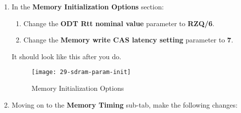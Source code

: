 \begin{flushleft}
\begin{enumerate}[
	label=\textbf{Step \arabic*.},
	leftmargin=*,
	widest={00},
	align=left]
\begin{enumerate}[
	label=\textbf{Step \arabic{enumi}\alph*.},
	leftmargin=*,
	align=left]
\item Change the \textbf{Total interface width} parameter to \textbf{32}.

\item Change the \textbf{Row address width} parameter to \textbf{15}.

\item Change the \textbf{Column address width} parameter to \textbf{10}.

\end{enumerate}

It should look like this after you do.

\begin{figure}[H]
\centering
\texttt{[image: 28-sdram-param]}
\caption{Memory Parameters}
\label{fig:28-sdram-param}
\end{figure}

\item In the \textbf{Memory Initialization Options} section:

\begin{enumerate}[
	label=\textbf{Step \arabic{enumi}\alph*.},
	leftmargin=*,
	align=left]

\item Change the \textbf{ODT Rtt nominal value} parameter to \textbf{RZQ/6}.

\item Change the \textbf{Memory write CAS latency setting} parameter to \textbf{7}.

\end{enumerate}

It should look like this after you do.

\begin{figure}[H]
\centering
\texttt{[image: 29-sdram-param-init]}
\caption{Memory Initialization Options}
\label{fig:29-sdram-param-init}
\end{figure}

\newpage

\item Moving on to the \textbf{Memory Timing} sub-tab, make the following changes:

\begin{enumerate}[
	label=\textbf{Step \arabic{enumi}\alph*.},
	leftmargin=*,
	align=left]


\end{enumerate}
\end{enumerate}
\end{flushleft}
